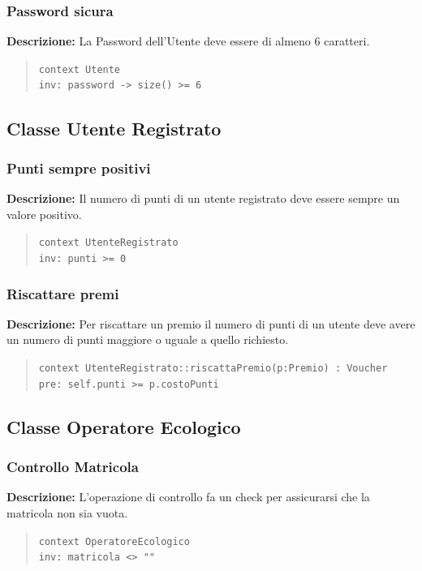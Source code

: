 \documentclass[12pt,a4paper]{article}
\begin{document}
\subsubsection{Password sicura} 
\textbf{Descrizione:} La Password dell'Utente deve essere di almeno 6 caratteri.
\begin{quote}
\texttt{context Utente}  \\
\texttt{inv: password -> size() >= 6} 
\end{quote}

\subsection{Classe Utente Registrato}

\subsubsection{Punti sempre positivi} 
\textbf{Descrizione:} Il numero di punti di un utente registrato deve essere sempre un valore positivo.
\begin{quote}
\texttt{context UtenteRegistrato}  \\
\texttt{inv: punti >= 0} 
\end{quote}

\subsubsection{Riscattare premi } 
\textbf{Descrizione:} Per riscattare un premio il numero di punti di un utente deve avere un numero di punti maggiore o uguale a quello richiesto.
\begin{quote}
\texttt{context UtenteRegistrato::riscattaPremio(p:Premio) : Voucher}  \\
\texttt{pre: self.punti >= p.costoPunti} 
\end{quote}

\subsection{Classe Operatore Ecologico}

\subsubsection{Controllo Matricola} 
\textbf{Descrizione:} L'operazione di controllo fa un check per assicurarsi che la matricola non sia vuota.
\begin{quote}
\texttt{context OperatoreEcologico}  \\
\texttt{inv: matricola <> ""} 
\end{quote}
\end{document}
